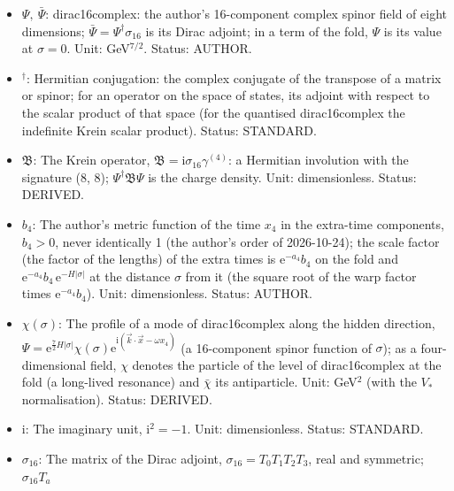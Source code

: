 \documentclass[
  10pt,
]{article}
\begin{document}
\begin{itemize}
  \(\kappa\lambda_{\mathrm{F}} = 12H\) of the fold; in UM-4 a free
  parameter, bounded from below by the propagation of the gauge fields
  in the bulk. Unit: GeV (1/length). Value: \(H > 2534\) GeV, about 2.5
  TeV (from the invisible width of the Z boson). Status: AUTHOR.
\item
  \(\Psi,\ \bar\Psi\): dirac16complex: the author's 16-component complex
  spinor field of eight dimensions;
  \(\bar\Psi = \Psi^\dagger\sigma_{16}\) is its Dirac adjoint; in a term
  of the fold, \(\Psi\) is its value at \(\sigma = 0\). Unit:
  GeV\(^{7/2}\). Status: AUTHOR.
\item
  \({}^\dagger\): Hermitian conjugation: the complex conjugate of the
  transpose of a matrix or spinor; for an operator on the space of
  states, its adjoint with respect to the scalar product of that space
  (for the quantised dirac16complex the indefinite Krein scalar
  product). Status: STANDARD.
\item
  \(\mathfrak{B}\): The Krein operator,
  \(\mathfrak{B} = \mathrm{i}\sigma_{16}\gamma^{(4)}\): a Hermitian
  involution with the signature (8, 8); \(\Psi^\dagger\mathfrak{B}\Psi\)
  is the charge density. Unit: dimensionless. Status: DERIVED.
\item
  \(b_4\): The author's metric function of the time \(x_4\) in the
  extra-time components, \(b_4 > 0\), never identically 1 (the author's
  order of 2026-10-24); the scale factor (the factor of the lengths) of
  the extra times is \(\mathrm{e}^{-a_4}b_4\) on the fold and
  \(\mathrm{e}^{-a_4}b_4\,\mathrm{e}^{-H\lvert\sigma\rvert}\) at the
  distance \(\sigma\) from it (the square root of the warp factor times
  \(\mathrm{e}^{-a_4}b_4\)). Unit: dimensionless. Status: AUTHOR.
\item
  \(\chi(\sigma)\): The profile of a mode of dirac16complex along the
  hidden direction,
  \(\Psi = \mathrm{e}^{\frac72H\lvert\sigma\rvert}\chi(\sigma)\mathrm{e}^{\mathrm{i}(\vec k\cdot\vec x - \omega x_4)}\)
  (a 16-component spinor function of \(\sigma\)); as a four-dimensional
  field, \(\chi\) denotes the particle of the level of dirac16complex at
  the fold (a long-lived resonance) and \(\bar\chi\) its antiparticle.
  Unit: GeV\(^{2}\) (with the \(V_*\) normalisation). Status: DERIVED.
\item
  \(\mathrm{i}\): The imaginary unit, \(\mathrm{i}^2 = -1\). Unit:
  dimensionless. Status: STANDARD.
\item
  \(\sigma_{16}\): The matrix of the Dirac adjoint,
  \(\sigma_{16} = T_0T_1T_2T_3\), real and symmetric; \(\sigma_{16}T_a\)

\end{itemize}
\end{document}
